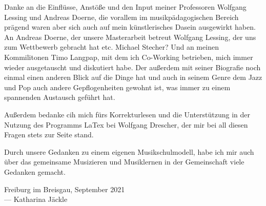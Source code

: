 
Danke an die Einflüsse, Anstöße und den Input meiner Professoren Wolfgang
Lessing und Andreas Doerne, die vorallem im musikpädagogischen Bereich prägend
waren aber sich auch auf mein künstlerisches Dasein ausgewirkt haben. 
An Andreas Doerne, der unsere Masterarbeit betreut
Wolfgang Lessing, der uns zum Wettbewerb gebracht hat etc.
Michael Stecher?
Und an meinen Kommilitonen Timo Langpap, mit dem ich Co-Working betrieben, mich
immer wieder ausgetauscht und diskutiert habe. Der außerdem mit seiner Biografie
noch einmal einen anderen Blick auf die Dinge hat und auch in seinem Genre dem
Jazz und Pop auch andere Gepflogenheiten gewohnt ist, was immer zu einem
spannenden Austausch geführt hat. 

Außerdem bedanke cih mich fürs Korrekturlesen und die Unterstützung in der
Nutzung des Programms LaTex bei Wolfgang Drescher, der mir bei all diesen Fragen
stets zur Seite stand. 

Durch unsere Gedanken zu einem eigenen Musikschulmodell, habe ich mir auch über
das gemeinsame Musizieren und Musiklernen in der Gemeinschaft viele Gedanken
gemacht.




\vspace{0.5cm}

\begin{flushright}
	{
		\small
		Freiburg im Breisgau, September 2021\\
		--- Katharina Jäckle
	}
\end{flushright}

